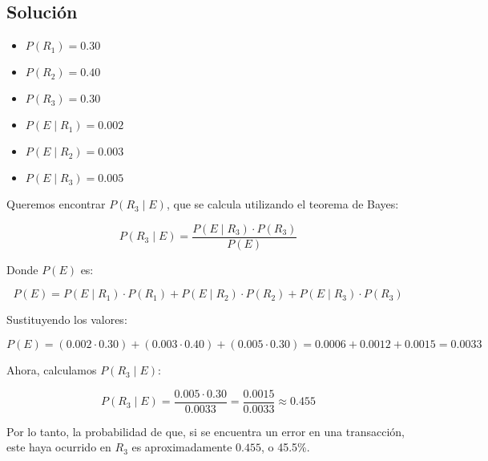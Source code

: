 \documentclass[12pt,a4paper]{article}
\begin{document}
\subsection*{Solución}

\begin{itemize}
    \item \( P(R_1) = 0.30 \)
    \item \( P(R_2) = 0.40 \)
    \item \( P(R_3) = 0.30 \)
    \item \( P(E \mid R_1) = 0.002 \)
    \item \( P(E \mid R_2) = 0.003 \)
    \item \( P(E \mid R_3) = 0.005 \)
\end{itemize}

Queremos encontrar \( P(R_3 \mid E) \), que se calcula utilizando el teorema de Bayes:

\[
P(R_3 \mid E) = \frac{P(E \mid R_3) \cdot P(R_3)}{P(E)}
\]

Donde \( P(E) \) es:

\[
P(E) = P(E \mid R_1) \cdot P(R_1) + P(E \mid R_2) \cdot P(R_2) + P(E \mid R_3) \cdot P(R_3)
\]

Sustituyendo los valores:

\[
P(E) = (0.002 \cdot 0.30) + (0.003 \cdot 0.40) + (0.005 \cdot 0.30) = 0.0006 + 0.0012 + 0.0015 = 0.0033
\]

Ahora, calculamos \( P(R_3 \mid E) \):

\[
P(R_3 \mid E) = \frac{0.005 \cdot 0.30}{0.0033} = \frac{0.0015}{0.0033} \approx 0.455
\]

Por lo tanto, la probabilidad de que, si se encuentra un error en una transacción, este haya ocurrido en \( R_3 \) es aproximadamente \( 0.455 \), o 45.5\%.
\end{document}
